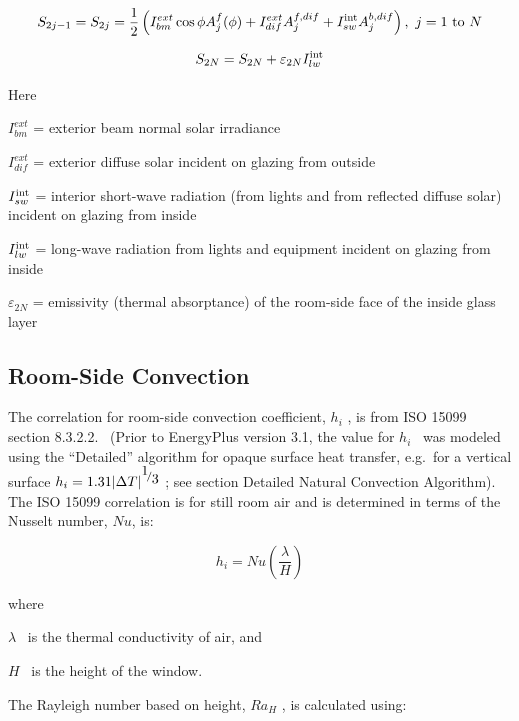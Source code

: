 \begin{equation}
{S_{2j - 1}} = {S_{2j}} = \frac{1}{2}\left( {I_{bm}^{ext}\cos \phi A_j^f(\phi ) + I_{dif}^{ext}A_j^{f,dif} + I_{sw}^{{\mathop{\rm int}} }A_j^{b,dif}} \right),{\rm{    ~}}j = 1{\rm{~to~}}N
\end{equation}

\begin{equation}
{S_{2N}} = {S_{2N}} + {\varepsilon_{2N}}I_{lw}^{{\mathop{\rm int}} }
\end{equation}

Here

\(I_{bm}^{ext}\) = exterior beam normal solar irradiance

\(I_{dif}^{ext}\) = exterior diffuse solar incident on glazing from outside

\(I_{sw}^{{\mathop{\rm int}} }\) = interior short-wave radiation (from lights and from reflected diffuse solar) incident on glazing from inside

\(I_{lw}^{{\mathop{\rm int}} }\) = long-wave radiation from lights and equipment incident on glazing from inside

\({\varepsilon_{2N}}\) = emissivity (thermal absorptance) of the room-side face of the inside glass layer

\subsection{Room-Side Convection}\label{room-side-convection}

The correlation for room-side convection coefficient, \({h_i}\) , is from ISO 15099 section 8.3.2.2.~ (Prior to EnergyPlus version 3.1, the value for \({h_i}\) ~was modeled using the ``Detailed'' algorithm for opaque surface heat transfer, e.g.~for a vertical surface \({h_i} = 1.31{\left| {\Delta T} \right|^{{\raise0.7ex\hbox{1} \!\mathord{\left/ {\vphantom {1 3}}\right.}\!\lower0.7ex\hbox{3}}}}\) ; see section Detailed Natural Convection Algorithm).~ The ISO 15099 correlation is for still room air and is determined in terms of the Nusselt number, \(Nu\), is:

\begin{equation}
{h_i} = Nu\left( {\frac{\lambda }{H}} \right)
\end{equation}

where

\(\lambda\) ~is the thermal conductivity of air, and

\(H\) ~is the height of the window.

The Rayleigh number based on height, \(R{a_H}\) , is calculated using:

